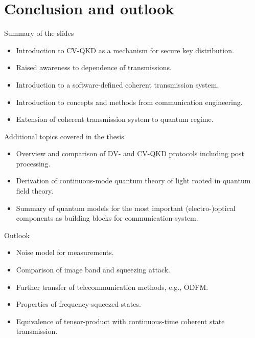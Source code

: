 \documentclass[aspectratio=169,usenames,dvipsnames]{beamer}
\begin{document}
	\section{Conclusion and outlook}
	
	\begin{frame}{Summary of the slides}
		\begin{itemize}
			\item Introduction to CV-QKD as a mechanism for secure key distribution.
			\item Raised awareness to dependence of transmissions.
			\item Introduction to a software-defined coherent transmission system.
			\item Introduction to concepts and methods from communication engineering.
			\item Extension of coherent transmission system to quantum regime.
		\end{itemize}
	\end{frame}
	
	\begin{frame}{Additional topics covered in the thesis}
		\begin{itemize}
			\item Overview and comparison of DV- and CV-QKD protocols including post processing.
			\item Derivation of continuous-mode quantum theory of light rooted in quantum field theory.
			\item Summary of quantum models for the most important (electro-)optical components as building blocks for communication system.
		\end{itemize}		
	\end{frame}
	
	\begin{frame}{Outlook}
		\begin{itemize}
			\item Noise model for measurements.
			\item Comparison of image band and squeezing attack.
			\item Further transfer of telecommunication methods, e.g., ODFM.
			\item Properties of frequency-squeezed states.
			\item Equivalence of tensor-product with continuous-time coherent state transmission.
		\end{itemize}
	\end{frame}
\end{document}

